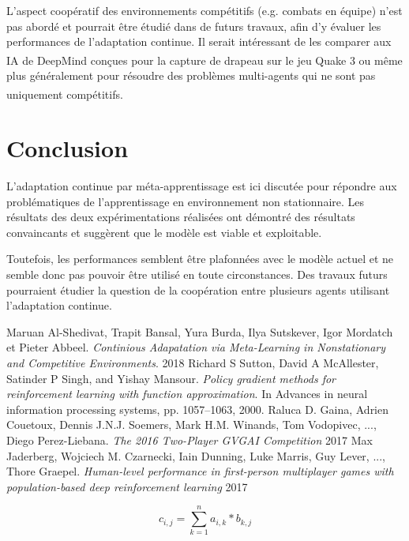 \documentclass[a4paper,11pt]{article}
\begin{document}
    L'aspect coopératif des environnements compétitifs (e.g. combats en équipe) n'est pas abordé et 
    pourrait être étudié dans de futurs travaux, afin d'y évaluer les performances de l'adaptation 
    continue. Il serait intéressant de les comparer aux IA de DeepMind conçues pour la capture de drapeau sur 
    le jeu Quake 3\textsuperscript{\cite{jaderberg}} ou même plus généralement pour résoudre des problèmes multi-agents qui ne 
    sont pas uniquement compétitifs\textsuperscript{\cite{raluca}}.

    \section{Conclusion}

    L'adaptation continue par méta-apprentissage est ici discutée pour répondre aux problématiques de l'apprentissage
    en environnement non stationnaire. Les résultats des deux expérimentations réalisées ont démontré
    des résultats convaincants et suggèrent que le modèle est viable et exploitable.

    Toutefois, les performances semblent être plafonnées avec le modèle actuel et ne semble donc pas 
    pouvoir être utilisé en toute circonstances. Des travaux futurs pourraient étudier la question de 
    la coopération entre plusieurs agents utilisant l'adaptation continue.

    \begin{thebibliography}{9}
        Maruan Al-Shedivat, Trapit Bansal, Yura Burda, Ilya Sutskever, Igor Mordatch et Pieter Abbeel.
        \emph{Continious Adapatation via Meta-Learning in Nonstationary and Competitive Environments}.
        2018
        Richard S Sutton, David A McAllester, Satinder P Singh, and Yishay Mansour.
        \emph{Policy gradient methods for reinforcement learning with function approximation}.
        In Advances in neural information processing systems, pp. 1057–1063, 2000.
        Raluca D. Gaina, Adrien Couetoux, Dennis J.N.J. Soemers, Mark H.M. Winands, Tom Vodopivec, ..., Diego Perez-Liebana.
        \emph{The 2016 Two-Player GVGAI Competition}
        2017
         Max Jaderberg, Wojciech M. Czarnecki, Iain Dunning, Luke Marris, Guy Lever, ..., Thore Graepel.
        \emph{Human-level performance in first-person multiplayer games with population-based deep reinforcement learning}
        2017
  
    \end{thebibliography}


    \begin{equation}
      c_{i,j} = \sum\limits_{k=1}^n a_{i,k} * b_{k,j}
    \end{equation}

 
  
\end{document}
